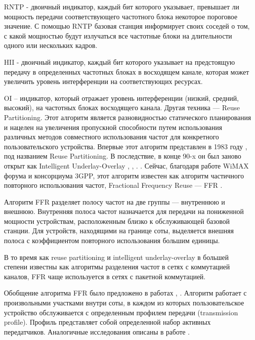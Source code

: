 RNTP - двоичный индикатор, каждый бит которого указывает, превышает ли мощность передачи соответствующего частотного блока некоторое пороговое значение. С помощью RNTP базовая станция информирует своих соседей о том, с какой мощностью будут излучаться все частотные блоки на длительности одного или нескольких кадров.

HII - двоичный индикатор, каждый бит которого указывает на предстоящую передачу в определенных частотных блоках в восходящем канале, которая может увеличить уровень интерференции на соответствующих ресурсах.

OI – индикатор, который отражает уровень интерференции (низкий, средний, высокий), на частотных блоках восходящего канала.
Другая техника — Reuse Partitioning. Этот алгоритм является разновидностью статического планирования и нацелен на увеличения пропускной способности путем использования различных методов совместного использования частот для конкретного пользовательского устройства. Впервые этот алгоритм представлен в 1983 году \cite{halpern1983reuse}, под названием Reuse Partitioning. В последствие, в конце 90-x он был заново открыт как Intelligent Underlay-Overlay \cite{ling1996capacity}, \cite{wille1996capacity}, \cite{nielsen1997capacity}. \cite{wigard1997improved}. Сейчас, благодаря работе WiMAX форума и консорциума 3GPP, этот алгоритм известен как алгоритм частичного повторного использования частот, Fractional Frequency Reuse — FFR \cite{wimax2006technical}.

Алгоритм FFR разделяет полосу частот на две группы — внутреннюю и внешнюю. Внутренняя полоса частот назначается для передачи на пониженной мощности устройствам, расположенным близко к обслуживающей базовой станции. Для устройств, находящими на границе соты, выделяется внешняя полоса с коэффициентом повторного использования большим единицы.

В то время как reuse partitioning и intelligent underlay-overlay в большей степени известны как алгоритмы разделения частот в сетях с коммутацией каналов, FFR чаще используется в сетях с пакетной коммутацией.

Обобщение алгоритма FFR было предложено в работах \cite{bonald2005inter}, \cite{bonald2006inter}. Алгоритм работает с произвольными участками внутри соты, в каждом из которых пользовательское устройство обслуживается с определенным профилем передачи (transmission profile). Профиль представляет собой определенной набор активных передатчиков. Аналогичные исследования описаны в работе \cite{liu2006inter}.

